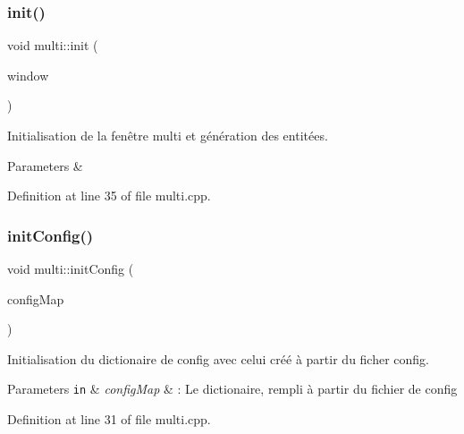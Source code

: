 \mbox{\label{namespacemulti_a7d4e2144fca3a548868c821d3d5a17cc}} 
\subsubsection{\texorpdfstring{init()}{init()}}
{\footnotesize\ttfamily void multi\+::init (\begin{DoxyParamCaption}\item[{\hyperlink{class_min_g_l}{Min\+GL} \&}]{window }\end{DoxyParamCaption})}



Initialisation de la fenêtre multi et génération des entitées. 


\begin{DoxyParams}{Parameters}
{\em } & \\
\hline
\end{DoxyParams}


Definition at line 35 of file multi.\+cpp.

\mbox{\label{namespacemulti_a916253e013641aaa278947378b6c816a}} 
\subsubsection{\texorpdfstring{init\+Config()}{initConfig()}}
{\footnotesize\ttfamily void multi\+::init\+Config (\begin{DoxyParamCaption}\item[{std\+::map$<$ std\+::string, std\+::string $>$ \&}]{config\+Map }\end{DoxyParamCaption})}



Initialisation du dictionaire de config avec celui créé à partir du ficher config. 


\begin{DoxyParams}[1]{Parameters}
\mbox{\tt in}  & {\em config\+Map} & \+: Le dictionaire, rempli à partir du fichier de config \\
\hline
\end{DoxyParams}


Definition at line 31 of file multi.\+cpp.

\mbox{\label{namespacemulti_a2ece1e3aedf924d21b2ef9f2f2f9140c}} 
